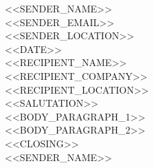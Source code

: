\documentclass[11pt,a4paper]{article}
\begin{document}
\noindent <<SENDER_NAME>>\\ <<SENDER_EMAIL>>\\ <<SENDER_LOCATION>>\\[1em]
<<DATE>>\\[1em]
\noindent <<RECIPIENT_NAME>>\\ <<RECIPIENT_COMPANY>>\\ <<RECIPIENT_LOCATION>>\\[1em]
<<SALUTATION>>\\[1em]
<<BODY_PARAGRAPH_1>>\\[1em]
<<BODY_PARAGRAPH_2>>\\[1em]
<<CLOSING>>\\
<<SENDER_NAME>>
\end{document}
